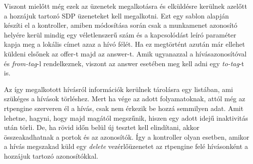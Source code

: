 Viszont mielőtt még ezek az üzenetek megalkotásra és elküldésre kerülnek azelőtt
a hozzájuk tartozó SDP üzeneteket kell megalkotni. Ezt egy sablon alapján készíti el 
a kontroller, amiben módosítása során csak a munkamenet azonosító helyére kerül
mindig egy véletlenszerű szám és a kapcsolódást leíró paraméter kapja meg a lokális 
címet azaz a hívó félét. Ha ez megtörtént azután már ellehet küldeni elsőnek az offer-t
majd az answer-t. Amik ugyanazzal a hívásazonosítóval és \textit{from-tag}-l rendelkeznek,
viszont az answer esetében meg kell adni egy \textit{to-tag}-t is.

Az így megalkotott hívásról információk kerülnek tárolásra egy listában, ami szükéges
a hívások törléshez. Mert ha vége az adott folyamatoknak, attól még az rtpengine szerveren
él a hívás, csak nem érkezik be hozzá semmilyen adat. Amit lehetne, hagyni, hogy majd 
magától megszűnik, hiszen egy adott idejű inaktivitás után törli. De, ha rövid időn 
belül új tesztet kell elindítani, akkor összeakadhatnak a portok és az azonosítók. Így a 
kontroller olyan esetben, amikor a hívás megszakad küld egy \textit{delete} vezérlőüzenetet
az rtpengine felé hívásonként a hozzájuk tartozó azonosítókkal.

